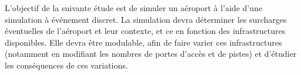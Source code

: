 L’objectif de la suivante étude est de simuler un aéroport à l’aide d’une simulation à événement discret. La simulation devra déterminer les surcharges éventuelles de l’aéroport et leur contexte, et ce en fonction des infrastructures disponibles. Elle devra être modulable, afin de faire varier ces infrastructures (notamment en modifiant les nombres de portes d’accès et de pistes) et d’étudier les conséquences de ces variations. 